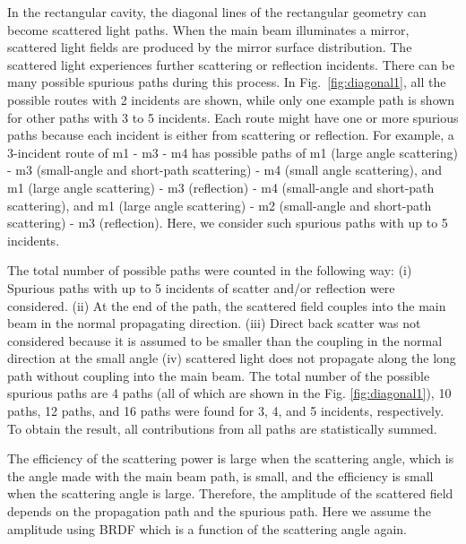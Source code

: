 In the rectangular cavity,
the diagonal lines of the rectangular geometry can become scattered light paths.
When the main beam illuminates a mirror, scattered light fields are produced
by the mirror surface distribution.
The scattered light experiences further scattering or reflection incidents.
There can be many possible spurious paths during this process.
In Fig.~\ref{fig:diagonal1}, all the possible routes with 2 incidents are
shown, while only one example path is shown for other paths
with 3 to 5 incidents. Each route might have one or more spurious paths
because each incident is either from scattering or reflection.
For example, a 3-incident route of m1 - m3 - m4 has
possible paths of m1 (large angle scattering)
- m3 (small-angle and short-path scattering)
- m4 (small angle scattering),
and m1 (large angle scattering) - m3 (reflection)
- m4 (small-angle and short-path scattering),
and m1 (large angle scattering) - m2 (small-angle and short-path scattering)
- m3 (reflection).
Here, we consider such spurious paths with up to 5 incidents.

The total number of possible paths were counted in the following way:
(i) Spurious paths with up to 5 incidents of scatter and/or reflection were considered.
(ii) At the end of the path, the scattered field couples into the main beam in the normal propagating direction. (iii) Direct back scatter was not considered because it is assumed to be smaller than
the coupling in the normal direction at the small angle
(iv) scattered light does not propagate along the long path without coupling into
the main beam.
The total number of the possible spurious paths are
4 paths (all of which are shown in the Fig. \ref{fig:diagonal1}), 10 paths,
12 paths, and 16 paths were found for 3, 4, and 5 incidents, respectively.
To obtain the result, all contributions from all paths are statistically summed.

The efficiency of the scattering power is large when the scattering angle,
which is the angle made with the main beam path, is small,
and the efficiency is small when the scattering angle is large.
Therefore, the amplitude of the scattered field depends on the propagation path
and the spurious path.
Here we assume the amplitude using BRDF
which is a function of the scattering angle again.


